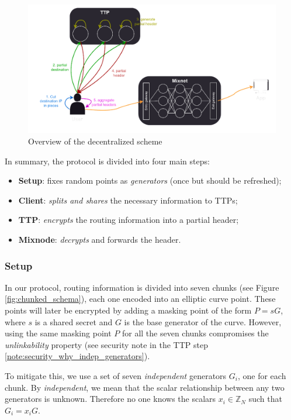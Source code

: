 \begin{figure}[H]
    \centering
    \includegraphics[width=1\linewidth]{Images/sphinx_ttp.png}
    \caption{Overview of the decentralized scheme}
    \label{fig:overall_schema}
\end{figure}

\noindent In summary, the protocol is divided into four main steps:
\begin{itemize}
    \item \textbf{Setup}: fixes random points as \textit{generators} (once but should be refreshed);
    \item \textbf{Client}: \textit{splits and shares} the necessary information to TTPs;
    \item \textbf{TTP}: \textit{encrypts} the routing information into a partial header;
    \item \textbf{Mixnode}: \textit{decrypts} and forwards the header.
\end{itemize}


\subsubsection{Setup}

In our protocol, routing information is divided into seven chunks (see Figure \ref{fig:chunked_schema}), each one encoded into an elliptic curve point. 
These points will later be encrypted by adding a masking point of the form $ P = s G $, where $ s $ is a shared secret and $ G $ is the base generator of the curve.
However, using the same masking point $ P $ for all the seven chunks compromises the \textit{unlinkability} property
(see security note in the TTP step \ref{note:security_why_indep_generators}).

To mitigate this, we use a set of seven \textit{independent} generators $ G_i $, one for each chunk. 
By \textit{independent}, we mean that the scalar relationship between any two generators is unknown. 
Therefore no one knows the scalars $ x_i \in \mathbb{Z}_N $ such that $ G_i = x_i G $.


